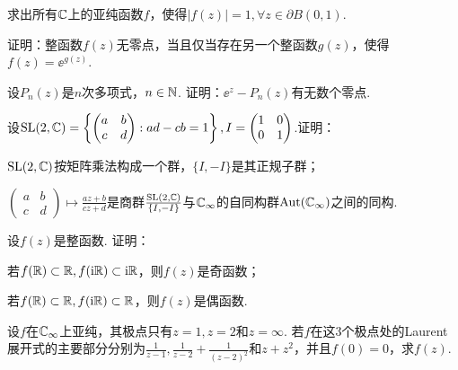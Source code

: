 \begin{xiti}
  \item 求出所有$\mathbb C$上的亚纯函数$f$，使得$|f(z)|=1,\forall z\in \partial B(0,1)$.
  \item 证明：整函数$f(z)$无零点，当且仅当存在另一个整函数$g(z)$，使得$f(z)=\ee^{g(z)}$.
  \item 设$P_n(z)$是$n$次多项式，$n\in\mathbb N$. 证明：$\ee^z-P_n(z)$有无数个零点.
  \item 设$\operatorname{SL}(2,\mathbb C)=\left\{\begin{pmatrix}
                           a & b \\
                           c & d
                           \end{pmatrix}:ad - cb = 1\right\},
                           I = \begin{pmatrix}
                           1 & 0 \\
                           0 & 1
                           \end{pmatrix}$.证明：
    \begin{enuma}
      \item $\operatorname{SL}(2,\mathbb C)$按矩阵乘法构成一个群，$\{ I,- I\}$是其正规子群；
      \item $\begin{pmatrix}
        a & b \\
        c & d
       \end{pmatrix}\mapsto\frac{az+b}{cz+d}$是商群$\frac{\operatorname{SL}(2,\mathbb C)}{\{ I,- I\}}$与$\mathbb C_\infty$的自同构群$\operatorname{Aut}(\mathbb C_\infty)$之间的同构.
    \end{enuma}
  \item 设$f(z)$是整函数. 证明：
    \begin{enuma}
      \item 若$f(\mathbb R)\subset \mathbb R,f(\mathrm i\mathbb R)\subset \mathrm i\mathbb R$，则$f(z)$是奇函数；
      \item 若$f(\mathbb R)\subset \mathbb R,f(\mathrm i\mathbb R)\subset \mathbb R$，则$f(z)$是偶函数.
    \end{enuma}
  \item 设$f$在$\mathbb C_\infty$上亚纯，其极点只有$z=1,z=2$和$z=\infty$. 若$f$在这$3$个极点处的Laurent展开式的主要部分分别为$\frac1{z-1},\frac1{z-2}+\frac1{(z-2)^2}$和$z+z^2$，并且$f(0)=0$，求$f(z)$.
\end{xiti}

